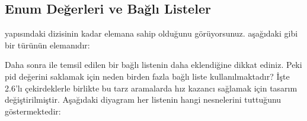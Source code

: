 \documentclass[a4paper,10pt,turkish]{sphinxmanual}
\begin{document}
\subsection{ Enum Değerleri ve Bağlı Listeler}
\label{\detokenize{processcontrolblock:pid-type-enum-degerleri-ve-bagli-listeler}}
\sphinxAtStartPar
{} yapısındaki  dizisinin  kadar elemana sahip olduğunu görüyorsunuz.
 aşağıdaki gibi bir  türünün elemanıdır:

\begin{sphinxVerbatim}[commandchars=\\\{\}]

\end{sphinxVerbatim}

\sphinxAtStartPar
Daha sonra  ile temsil edilen bir bağlı listenin daha eklendiğine dikkat ediniz.
Peki pid değerini saklamak için neden birden fazla bağlı liste kullanılmaktadır? İşte 2.6’lı
çekirdeklerle birlikte bu tarz aramalarda hız kazancı sağlamak için tasarım değiştirilmiştir.
Aşağıdaki diyagram her listenin hangi  nesnelerini tuttuğunu göstermektedir:

\end{document}
